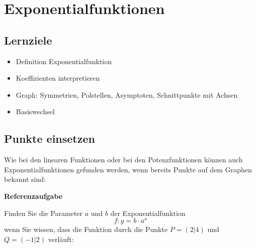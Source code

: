 
\section{Exponentialfunktionen}
\subsection*{Lernziele}

\begin{itemize}
\item Definition Exponentialfunktion
\item Koeffizienten interpretieren
\item Graph: Symmetrien, Polstellen, Asymptoten, Schnittpunkte mit
  Achsen
  \item Basiswechsel
\end{itemize}

\newpage

\subsection{Punkte einsetzen}
Wie bei den linearen Funktionen oder bei den Potenzfunktionen können auch Exponentialfunktionen gefunden werden, wenn bereits Punkte auf dem Graphen bekannt sind:

\textbf{Referenzaufgabe}

Finden Sie die Parameter $a$ und $b$ der Exponentialfunktion
$$f: y=b\cdot{}a^x$$
wenn Sie wissen, dass die Funktion durch die Punkte $P=(2|4)$ und $Q=(-1|2)$ verläuft:


